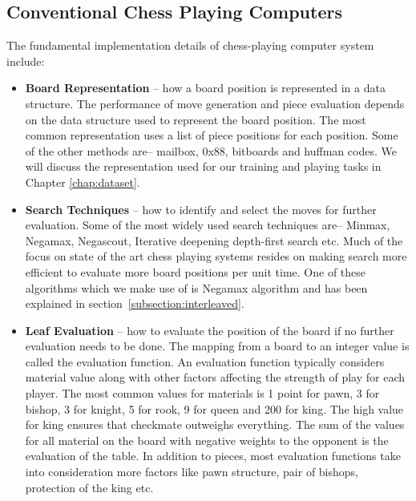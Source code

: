 \subsection*{Conventional Chess Playing Computers}
\label{subsection:conventional-chess}
The fundamental implementation details of chess-playing computer system include:
\begin{itemize}
\item \textbf{Board Representation} -- how a board position is represented in a 
data structure. The performance of move generation and piece evaluation depends 
on the data structure used to represent the board position. The most common 
representation uses a list of piece positions for each position. Some of the 
other methods are-- mailbox, 0x88, bitboards and huffman codes. We will discuss 
the representation used for our training and playing tasks in Chapter 
\ref{chap:dataset}.

\item \textbf{Search Techniques} -- how to identify and select the moves for 
further evaluation. Some of the most widely used search techniques are-- 
Minmax, Negamax, Negascout, Iterative deepening depth-first search etc. Much of 
the 
focus on state of the art chess playing systems resides on making search more 
efficient to evaluate more board positions per unit time. One of these 
algorithms which we make use of is Negamax algorithm and has 
been explained in section~\ref{subsection:interleaved}.

\item\textbf{Leaf Evaluation} -- how to evaluate the position of the board if 
no 
further evaluation needs to be done. The mapping from a board to an integer 
value is called the evaluation function. An evaluation function typically 
considers material value along with other factors affecting the strength of 
play for each player. The most common values for materials is 1 point for pawn, 
3 for bishop, 3 for knight, 5 for rook, 9 for queen and 200 for king. The high 
value for king ensures that checkmate outweighs everything. The sum of the 
values for all material on the board with negative weights to the opponent is 
the evaluation of the table. In addition to pieces, most evaluation functions 
take into consideration more factors like pawn structure, pair of bishops, 
protection of the king etc.
\end{itemize}


